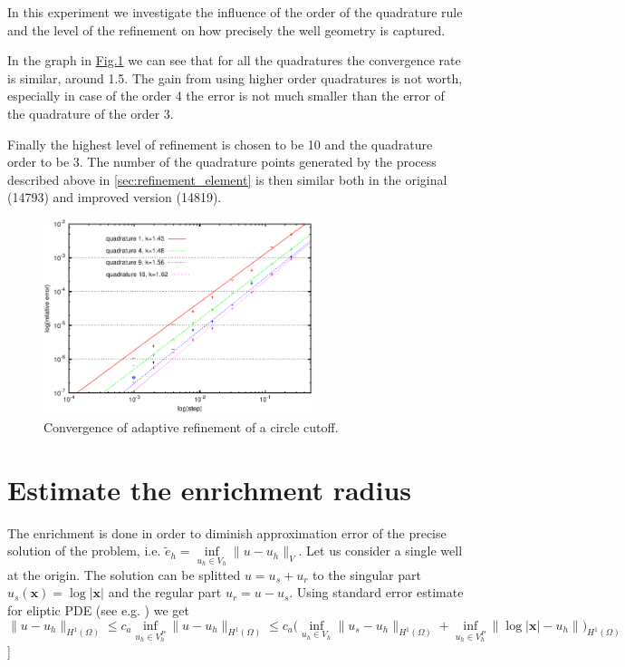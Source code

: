 \documentclass[preprint,12pt]{elsarticle}
\newcommand{\fig}[1]{\hyperref[#1]{Fig.\ref{#1}}}
\newcommand{\figpath}{../graphics/}
\def\vc#1{\mathbf{\boldsymbol{#1}}}     %
\def\norm#1{\| #1 \|}
\begin{document}
In this experiment we investigate the influence of the order of the quadrature rule and the level of
the refinement on how precisely the well geometry is captured.

In the graph in \fig{fig:adapt_ref_convergence} we can see that for all the quadratures the convergence rate
is similar, around 1.5. The gain from using higher order quadratures is not worth, especially in case 
of the order 4 the error is not much smaller than the error of the quadrature of the order 3. 

Finally the highest level of refinement is chosen to be 10 and the quadrature order to be 3. The number of
the quadrature points generated by the process described above in \ref{sec:refinement_element} is then similar 
both in the original (14793) and improved version (14819).

\begin{figure}[!htb]
  \centering    
  \includegraphics[width=0.7\textwidth]{results/adaptive_integration.pdf}
  \caption[Adaptive refinement convergence]{Convergence of adaptive refinement of a circle cutoff.}
  \label{fig:adapt_ref_convergence}
\end{figure}

\section{Estimate the enrichment radius}
The enrichment is done in order to diminish approximation error of the precise solution of the problem, i.e.
$\tilde e_h = \inf\limits_{u_h \in V_h} \| u - u_h \|_{V}$. Let us consider a single well at the origin. The solution
can be splitted $u=u_s+u_r$ to the singular part $u_s(\vc x)= \log |\vc x|$ and the regular part $u_r=u-u_s$.
Using standard error estimate for eliptic PDE (see e.g. \cite{arnold_lecture_2009}) we get
\[
   \norm{u - u_h}_{H^1(\Omega)} \le c_a \inf_{u_h \in V^P_h} \norm{u - u_h}_{H^1(\Omega)} 
   \le c_a \big(\inf_{u_h \in V_h} \norm{u_s - u_{h}}_{H^1(\Omega)} + \inf_{u_h \in V^P_h} \norm{\log |\vc x| - u_h})_{H^1(\Omega)}
\]
]
\end{document}
